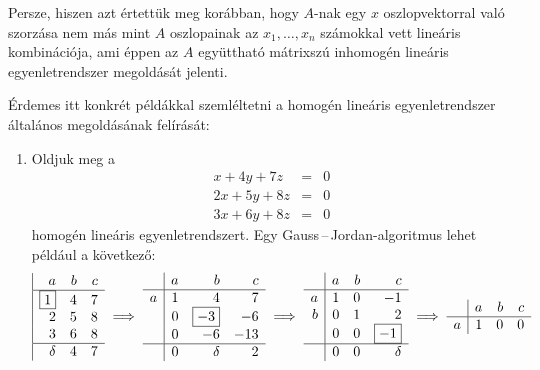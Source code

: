 \documentclass[a4paper, showtrims]{memoir}
\theoremstyle{plain}
\theoremstyle{remark}
\theoremstyle{definition}
\begin{document}
Persze, hiszen azt értettük meg korábban, hogy $A$-nak egy $x$ oszlopvektorral való szorzása
nem más mint $A$ oszlopainak az $x_1,\ldots,x_n$ számokkal vett lineáris kombinációja,
ami éppen az $A$ együttható mátrixszú inhomogén lineáris egyenletrendszer megoldását jelenti.

Érdemes itt konkrét példákkal szemléltetni a homogén lineáris egyenletrendszer általános megoldásának felírását:
\begin{enumerate}\label{ex:t-reg}
	\item
    Oldjuk meg a
    \begin{eqnarray*}
      x+4y+7z&=& 0\\
	  2x+5y+8z&=& 0\\
	  3x+6y+8z&=& 0
    \end{eqnarray*}
    homogén  lineáris egyenletrendszert.
    Egy Gauss\,--\,Jordan-algoritmus  lehet például a következő:
     \[
     \begin{array}{|rrr}
     a         & b & c \\
      \hline
      \boxed{1} & 4 & 7 \\
      2         & 5 & 8 \\
      3         & 6 & 8 \\
      \hline
      \delta    & 4 & 7
      \end{array}
      \implies
      \begin{array}{r|rrr}
        & a & b          & c   \\
      \hline
      a & 1 & 4          & 7   \\
        & 0 & \boxed{-3} & -6  \\
        & 0 & -6         & -13 \\
      \hline
        & 0 & \delta     & 2
      \end{array}
      \implies
      \begin{array}{r|rrr}
        & a & b & c          \\
      \hline
      a & 1 & 0 & -1         \\
      b & 0 & 1 & 2          \\
        & 0 & 0 & \boxed{-1} \\
      \hline
        & 0 & 0 & \delta
      \end{array}
      \implies
      \begin{array}{r|rrr}
        & a & b & c \\
      \hline
      a & 1 & 0 & 0 \\

\end{array}\]
\end{enumerate}
\end{document}
